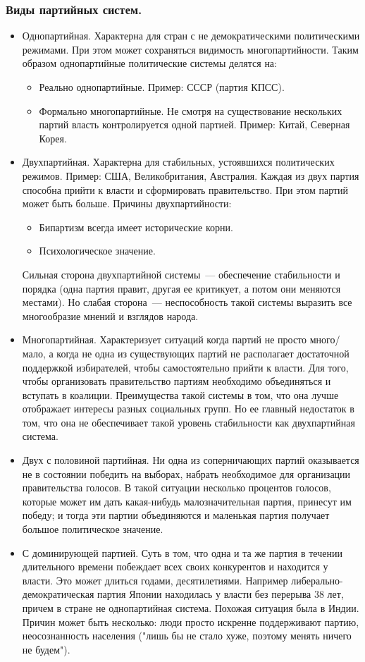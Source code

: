 \documentclass[12pt]{article}
\begin{document}
	\subsubsection{Виды партийных систем.}
	\begin{itemize}
		\item Однопартийная. Характерна для стран с не демократическими политическими режимами. При этом может сохраняться видимость многопартийности. Таким образом однопартийные политические системы делятся на:
		\begin{itemize}
			\item Реально однопартийные. Пример: СССР (партия КПСС).
			\item Формально многопартийные. Не смотря на существование нескольких партий власть контролируется одной партией. Пример: Китай, Северная Корея.
		\end{itemize}
		\item Двухпартийная. Характерна для стабильных, устоявшихся политических режимов. Пример: США, Великобритания, Австралия. Каждая из двух партия способна прийти к власти и сформировать правительство. При этом партий может быть больше. Причины двухпартийности:
		\begin{itemize}
			\item Бипартизм всегда имеет исторические корни.
			\item Психологическое значение.
		\end{itemize}
		Сильная сторона двухпартийной системы~--- обеспечение стабильности и порядка (одна партия правит, другая ее критикует, а потом они меняются местами). Но слабая сторона~--- неспособность такой системы выразить все многообразие мнений и взглядов народа.
		\item Многопартийная. Характеризует ситуаций когда партий не просто много/мало, а когда не одна из существующих партий не располагает достаточной поддержкой избирателей, чтобы самостоятельно прийти к власти. Для того, чтобы организовать правительство партиям необходимо объединяться и вступать в коалиции. Преимущества такой системы в том, что она лучше отображает интересы разных социальных групп. Но ее главный недостаток в том, что она не обеспечивает такой уровень стабильности как двухпартийная система.
		\item Двух с половиной партийная. Ни одна из соперничающих партий оказывается не в состоянии победить на выборах, набрать необходимое для организации правительства голосов. В такой ситуации несколько процентов голосов, которые может им дать какая-нибудь малозначительная партия, принесут им победу; и тогда эти партии объединяются и маленькая партия получает большое политическое значение.
		\item С доминирующей партией. Суть в том, что одна и та же партия в течении длительного времени побеждает всех своих конкурентов и находится у власти. Это может длиться годами, десятилетиями. Например либерально-демократическая партия Японии находилась у власти без перерыва $38$ лет, причем в стране не однопартийная система. Похожая ситуация была в Индии. Причин может быть несколько: люди просто искренне поддерживают партию, неосознанность населения ("лишь бы не стало хуже, поэтому менять ничего не будем").
	\end{itemize}
\end{document}
